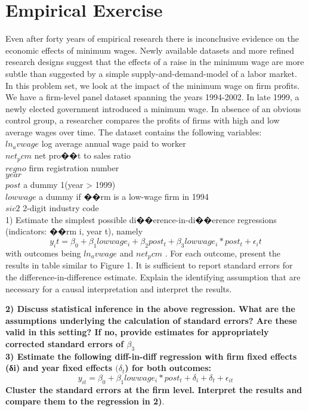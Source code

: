 \documentclass[a4paper,12pt,oneside,English]{article}
\begin{document}
\section{Empirical Exercise}

Even after forty years of empirical research there is inconclusive evidence on the economic effects of minimum wages. Newly available datasets and more refined research designs suggest that the effects of a raise in the minimum wage are more subtle than suggested by a simple supply-and-demand-model of a labor market. In this problem set, we look at the impact of the minimum wage on firm profits.\\
We have a firm-level panel dataset spanning the years 1994-2002. In late 1999, a newly elected government introduced a minimum wage. In absence of an obvious control group, a researcher compares the profits of firms with high and low average wages over time. The dataset contains the following variables:\\
$ln_avwage$ log average annual wage paid to worker\\
$net_pcm$ net pro��t to sales ratio\\
$regno$ firm registration number\\
$year$ \\
$post$ a dummy 1(year > 1999)\\ 
$lowwage$ a dummy if ��rm is a low-wage firm in 1994\\
$sic2$ 2-digit industry code\\
1) Estimate the simplest possible di��erence-in-di��erence regressions (indicators: ��rm i, year t), namely
\begin{equation}\label{eq7}
    y_it = \beta_0 + \beta_1lowwage_i + \beta_2post_t + \beta_3lowwage_i * post_t + \epsilon_it
\end{equation}
with outcomes being $ln_avwage$ and $net_pcm$ . For each outcome, present the results in table similar to Figure 1. It is sufficient to report standard errors for the difference-in-difference estimate. Explain the identifying assumption that are necessary for a causal interpretation and interpret the results.
 

\textbf{2) Discuss statistical inference in the above regression. What are the assumptions underlying the calculation of standard errors? Are these valid in this setting? If no, provide estimates for appropriately corrected standard errors of $\beta_3$}\\
  
\textbf{3) Estimate the following diff-in-diff regression with firm fixed effects (δi) and year fixed effects $(\delta_t$) for
both outcomes:}
\begin{equation}
    y_{it} = \beta_0 + \beta_1lowwage_i * post_t + \delta_i + \delta_t + \epsilon_{it}
\end{equation}
\textbf{Cluster the standard errors at the firm level. Interpret the results and compare them to the regression in 2)}.\\
\end{document}
